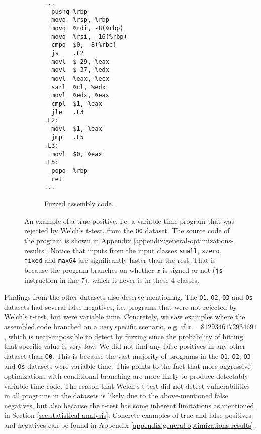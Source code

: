 \begin{figure}[H]
    \begin{subfigure}[b]{0.35\textwidth}
      \begin{lstlisting}[style=defstyle,language={[x86masm]Assembler},basicstyle=\small\ttfamily,breaklines=true]
...
  pushq	%rbp
  movq	%rsp, %rbp
  movq	%rdi, -8(%rbp)
  movq	%rsi, -16(%rbp)
  cmpq	$0, -8(%rbp)
  js	.L2
  movl	$-29, %eax
  movl	$-37, %edx
  movl	%eax, %ecx
  sarl	%cl, %edx
  movl	%edx, %eax
  cmpl	$1, %eax
  jle	.L3
.L2:
  movl	$1, %eax
  jmp	.L5
.L3:
  movl	$0, %eax
.L5:
  popq	%rbp
  ret
...\end{lstlisting} 
       \caption{Fuzzed assembly code.}
  \end{subfigure}
  \caption{An example of a true positive, i.e. a variable time program that was rejected by Welch's t-test, from the \texttt{O0} dataset. 
  The source code of the program is shown in Appendix \ref{appendix:general-optimizations-results}. 
  Notice that inputs from the input classes \texttt{small}, \texttt{xzero}, \texttt{fixed} and \texttt{max64} are significantly faster than the rest.
  That is because the program branches on whether $x$ is signed or not (\texttt{js} instruction in line 7), which it never is in these 4 classes.}
  \label{fig:general-optimizations-O0-true-positive}
\end{figure}

Findings from the other datasets also deserve mentioning.
The \texttt{O1}, \texttt{O2}, \texttt{O3} and \texttt{Os} datasets had several false negatives, i.e. programs that were not rejected by Welch's t-test, but were variable time.
Concretely, we saw examples where the assembled code branched on a \textit{very} specific scenario, e.g. if $x = 8129346172934691$, which is near-impossible to detect by fuzzing since the probability of hitting that specific value is very low.
We did not find any false positives in any other dataset than \texttt{O0}.
This is because the vast majority of programs in the \texttt{O1}, \texttt{O2}, \texttt{O3} and \texttt{Os} datasets were variable time.
This points to the fact that more aggressive optimizations with conditional branching are more likely to produce detectably variable-time code.
The reason that Welch's t-test did not detect vulnerabilities in all programs in the datasets is likely due to the above-mentioned false negatives, but also because the t-test has some inherent limitations as mentioned in Section \ref{sec:statistical-analysis}.
Concrete examples of true and false positives and negatives can be found in Appendix \ref{appendix:general-optimizations-results}.

